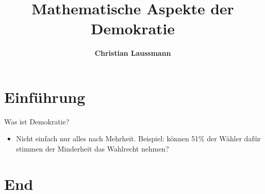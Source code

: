 \documentclass[aspectratio=169]{beamer}
\title{\textbf{\Huge Mathematische Aspekte der Demokratie}}
\author{\textcolor{secondarycolor}{\textbf{Christian Laussmann}}}
\date{}
\begin{document}
\frame{\titlepage}





\section{Einführung}

\begin{frame}{Was ist Demokratie?}
    \begin{itemize}
        \item Nicht einfach nur alles nach Mehrheit. Beispiel: können 51\% der Wähler dafür stimmen der Minderheit das Wahlrecht nehmen?
    \end{itemize}
\end{frame}





\section{End}
\end{document}

